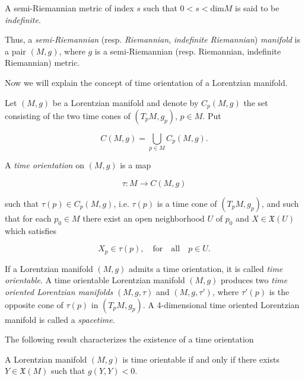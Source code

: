 A semi-Riemannian metric of index $s$ such that $0<s<\mathrm{dim}M$ is said to be \emph{indefinite}.

Thus, a \emph{semi-Riemannian} (resp. \emph{Riemannian}, \emph{indefinite Riemannian}) \emph{manifold} is a pair $(M,g)$, where $g$ is a semi-Riemannian (resp. Riemannian, indefinite Riemannian) metric.





Now we will explain the concept of time orientation of a Lorentzian manifold.

Let $(M,g)$ be a Lorentzian manifold and denote by $C_p(M,g)$ the set consisting of the two time cones of $(T_pM,g_p)$, $p\in M$. Put

\[
C(M,g)=\bigcup_{p\in M} C_p(M,g).
\]

A \emph{time orientation} on $(M,g)$ is a map

\[
\tau : M \longrightarrow C(M,g)
\]

such that $\tau(p)\in C_p(M,g)$, i.e. $\tau(p)$ is a time cone of $(T_pM,g_p)$, and such that for each $p_0\in M$ there exist an open neighborhood $U$ of $p_0$ and $X\in \mathfrak{X}(U)$ which satisfies

\[
X_p \in \tau(p), \quad \mathrm{for \quad all} \quad p\in U.
\]


If a Lorentzian manifold $(M,g)$ admits a time orientation, it is called \emph{time orientable}. A time orientable Lorentzian manifold $(M,g)$ produces two \emph{time oriented Lorentzian manifolds} $(M,g,\tau)$ and $(M,g,\tau ')$, where $\tau '(p)$ is the opposite cone of $\tau(p)$ in $(T_pM,g_p)$. A 4-dimensional time oriented Lorentzian manifold is called a \emph{spacetime}.

\vspace{2mm}

The following result characterizes the existence of a time orientation \cite[Lemma 5.32]{oneill83}

\begin{proposition}\label{time_orientable}

A Lorentzian manifold $(M,g)$ is time orientable if and only if there exists $Y\in \mathfrak{X}(M)$ such that $g(Y,Y)<0$.

\end{proposition}

